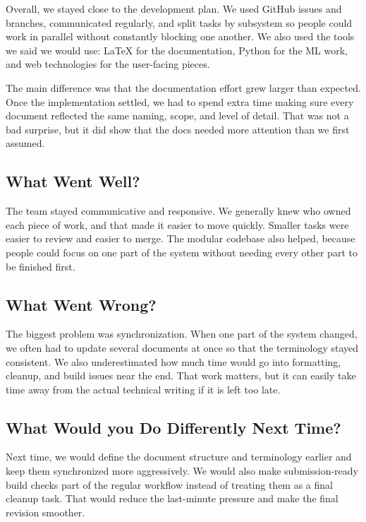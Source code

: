 \documentclass{article}
\begin{document}
Overall, we stayed close to the development plan. We used GitHub issues and
branches, communicated regularly, and split tasks by subsystem so people could
work in parallel without constantly blocking one another. We also used the tools
we said we would use: LaTeX for the documentation, Python for the ML work, and
web technologies for the user-facing pieces.

The main difference was that the documentation effort grew larger than expected.
Once the implementation settled, we had to spend extra time making sure every
document reflected the same naming, scope, and level of detail. That was not a
bad surprise, but it did show that the docs needed more attention than we first
assumed.

\subsection{What Went Well?}

The team stayed communicative and responsive. We generally knew who owned each
piece of work, and that made it easier to move quickly. Smaller tasks were easier
to review and easier to merge. The modular codebase also helped, because people
could focus on one part of the system without needing every other part to be
finished first.

\subsection{What Went Wrong?}

The biggest problem was synchronization. When one part of the system changed, we
often had to update several documents at once so that the terminology stayed
consistent. We also underestimated how much time would go into formatting,
cleanup, and build issues near the end. That work matters, but it can easily take
time away from the actual technical writing if it is left too late.

\subsection{What Would you Do Differently Next Time?}

Next time, we would define the document structure and terminology earlier and
keep them synchronized more aggressively. We would also make submission-ready
build checks part of the regular workflow instead of treating them as a final
cleanup task. That would reduce the last-minute pressure and make the final
revision smoother.
\end{document}

